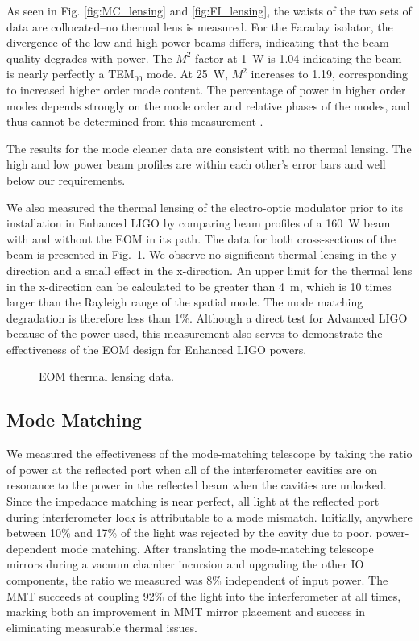 As seen in Fig. \ref{fig:MC_lensing} and \ref{fig:FI_lensing}, the
waists of the two sets of data are collocated--no thermal lens is
measured. For the Faraday isolator, the divergence of the low and high
power beams differs, indicating that the beam quality degrades with
power. The $M^2$ factor at 1~W is 1.04 indicating the beam is 
nearly perfectly a TEM$_{00}$ mode. At 25~W, $M^2$ increases to 1.19,
corresponding to increased higher order mode content. The percentage
of power in higher order modes depends strongly on the mode order and
relative phases of the modes, and thus cannot be determined from this
measurement \citep{Kwee2007Laser}.

The results for the mode cleaner data are consistent with no thermal
lensing. The high and low power beam profiles are within each
other's error bars and well below our requirements. 

We also measured the thermal lensing of the electro-optic modulator
prior to its installation in Enhanced LIGO by comparing beam profiles
of a 160~W beam with and without the EOM in its path. The data for
both cross-sections of the beam is presented in
Fig.~\ref{fig:EOMlensing}. We observe no significant thermal lensing
in the y-direction and a small effect in the x-direction. An upper
limit for the thermal lens in the x-direction can be calculated to be
greater than 4~m, which is 10 times larger than the Rayleigh range of
the spatial mode. The mode matching degradation is therefore less
than 1\%. Although a direct test for Advanced LIGO because of the
power used, this measurement also serves to demonstrate the
effectiveness of the EOM design for Enhanced LIGO powers.

\begin{figure}
\begin{centering}
\caption{EOM thermal lensing data.}
\label{fig:EOMlensing}
\end{centering}
\end{figure}


\subsection{Mode Matching}
We measured the effectiveness of the mode-matching telescope by taking
the ratio of power at the reflected port when all of the
interferometer cavities are on resonance to the power in the reflected
beam when the cavities are unlocked. Since the impedance matching is
near perfect, all light at the reflected port during interferometer
lock is attributable to a mode mismatch.  Initially, anywhere between
10\% and 17\% of the light was rejected by the cavity due to poor,
power-dependent mode matching.  After translating the mode-matching
telescope mirrors during a vacuum chamber incursion and upgrading the
other IO components, the ratio we measured was 8\% independent of
input power. The MMT succeeds at coupling 92\% of the light into the
interferometer at all times, marking both an improvement in MMT mirror
placement and success in eliminating measurable thermal issues.


